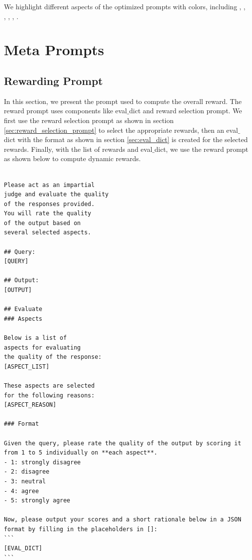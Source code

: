 

We highlight different aspects of the optimized prompts with colors, including , , , , , .



\newpage
\section{Meta Prompts}
\label{sec:meta_prompts}


\subsection{Rewarding Prompt}

In this section, we present the prompt used to compute the overall reward. The reward prompt uses components like eval$\_$dict and reward selection prompt. We first use the reward selection prompt as shown in section \ref{sec:reward_selection_prompt} to select the appropriate rewards, then an eval$\_$dict with the format as shown in section \ref{sec:eval_dict} is created for the selected rewards. Finally, with the list of rewards and eval$\_$dict, we use the reward prompt as shown below to compute dynamic rewards.

\begin{lstlisting}[breaklines=true,breakatwhitespace=true]

Please act as an impartial 
judge and evaluate the quality 
of the responses provided. 
You will rate the quality 
of the output based on 
several selected aspects.

## Query: 
[QUERY]

## Output:
[OUTPUT]

## Evaluate
### Aspects 

Below is a list of 
aspects for evaluating 
the quality of the response:
[ASPECT_LIST]

These aspects are selected 
for the following reasons:
[ASPECT_REASON]

### Format 

Given the query, please rate the quality of the output by scoring it from 1 to 5 individually on **each aspect**. 
- 1: strongly disagree 
- 2: disagree 
- 3: neutral
- 4: agree
- 5: strongly agree

Now, please output your scores and a short rationale below in a JSON format by filling in the placeholders in []:
```
[EVAL_DICT]
```
\end{lstlisting}

